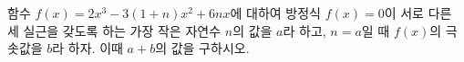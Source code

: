 함수 $f(x)=2x^3-3(1+n)x^2+6nx$에 대하여 방정식 $f(x)=0$이 서로 다른 세 실근을 갖도록 하는 가장 작은 자연수 $n$의 값을 $a$라 하고, $n=a$일 때 $f(x)$의 극솟값을 $b$라 하자. 이때 $a+b$의 값을 구하시오.
